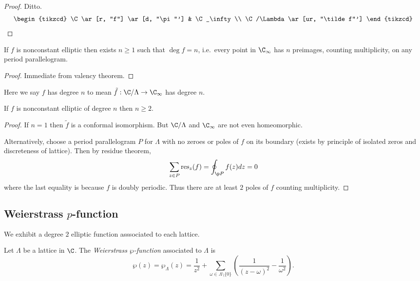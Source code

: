 \documentclass[a4paper]{article}
\begin{document}
\begin{proof}
  Ditto.
  \[
    \begin{tikzcd}
      \C \ar[r, "f"] \ar[d, "\pi"'] & \C_\infty \\
      \C/\Lambda \ar[ur, "\tilde f"']
    \end{tikzcd}
  \]
\end{proof}

\begin{corollary}
  If \(f\) is nonconstant elliptic then exists \(n \geq 1\) such that \(\deg f = n\), i.e.\ every point in \(\C_\infty\) has \(n\) preimages, counting multiplicity, on any period parallelogram.
\end{corollary}

\begin{proof}
  Immediate from valency theorem.
\end{proof}

Here we say \(f\) has degree \(n\) to mean \(\tilde f: \C/\Lambda \to \C_\infty\) has degree \(n\).

\begin{corollary}
  If \(f\) is nonconstant elliptic of degree \(n\) then \(n \geq 2\).
\end{corollary}

\begin{proof}
  If \(n = 1\) then \(\tilde f\) is a conformal isomorphism. But \(\C/\Lambda\) and \(\C_\infty\) are not even homeomorphic.

  Alternatively, choose a period parallelogram \(P\) for \(\Lambda\) with no zeroes or poles of \(f\) on its boundary (exists by principle of isolated zeros and discreteness of lattice). Then by residue theorem,
  \[
    \sum_{z \in P} \operatorname{res}_z(f) = \oint_{\p P} f(z) dz = 0
  \]
  where the last equality is because \(f\) is doubly periodic. Thus there are at least \(2\) poles of \(f\) counting multiplicity.
\end{proof}

\subsection{Weierstrass \(p\)-function}

We exhibit a degree \(2\) elliptic function asssociated to each lattice.

\begin{definition}
  Let \(\Lambda\) be a lattice in \(\C\). The \emph{Weierstrass \(\wp\)-function} associated to \(\Lambda\) is
  \[
    \wp(z) = \wp_\Lambda(z) = \frac{1}{z^2} + \sum_{\omega \in \Lambda \setminus \{0\}} \left( \frac{1}{(z - \omega)^2} - \frac{1}{\omega^2} \right).
  \]
\end{definition}
\end{document}
